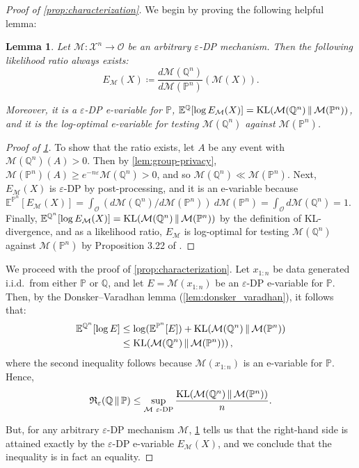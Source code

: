 \documentclass{article}
\DeclareMathOperator{\KLop}{KL}
\newcommand{\KL}[2]{%
  \mathchoice
    {\KLop\!\left(#1\,\middle\|\,#2\right)}%
    {\KLop(#1\,\Vert\,#2)}%
    {\KLop(#1\,\Vert\,#2)}%
    {\KLop(#1\,\Vert\,#2)}%
}
\newcommand{\Rdiv}[3][\eps]{%
  \mathfrak{R}_{#1}\!\left(#2\,\middle\|\,#3\right)%
}
\newcommand{\Null}{\mathbb{P}}
\newcommand{\E}{\mathbb{E}}
\newcommand{\Alt}{\mathbb{Q}}
\newcommand{\M}{\mathcal{M}}
\newcommand{\opt}{\Rdiv{\Alt}{\Null}}
\newcommand{\eps}{\varepsilon}
\newtheorem{lemma}{Lemma}[theorem]
\begin{document}
\begin{proof}[Proof of \cref{prop:characterization}]

We begin by proving the following helpful lemma:

\begin{lemma}\label{lem:dp-ratio}
    Let $\M: \mathcal{X}^n \to \mathcal{O}$ be an arbitrary $\varepsilon$-DP mechanism. Then the following likelihood ratio always exists:
    \begin{equation}
        E_\M(X)\coloneq\frac{d\M(\Alt^n)}{d\M(\Null^n)}(\M(X)).
    \end{equation}

    Moreover, it is a $\eps$-DP e-variable for $\Null$, $\E^\Alt[\log E_\M(X)] = \KL{\M(\Alt^n)}{\M(\Null^n)}$, and it is the log-optimal e-variable for testing $\M(\Alt^n)$ against $\M(\Null^n)$.
\end{lemma}
\begin{proof}[Proof of \cref{lem:dp-ratio}]
    To show that the ratio exists, let $A$ be any event with $\M(\Alt^n)(A) > 0$. Then by \cref{lem:group-privacy}, $\M(\Null^n)(A) \geq e^{-n\varepsilon}\M(\Alt^n) > 0$, and so $\M(\Alt^n) \ll \M(\Null^n)$.  Next, $E_\M(X)$ is $\eps$-DP by post-processing, and it is an e-variable because $\E^{\Null^n}[E_\M(X)] = \int_\mathcal{O} (d\M(\Alt^n)/d\M(\Null^n))~d\M(\Null^n) = \int_\mathcal{O} d\M(\Alt^n) = 1$. Finally, $\E^{\Alt^n}[\log E_\M(X)] = \KL{\M(\Alt^n)}{\M(\Null^n)}$ by the definition of KL-divergence, and as a likelihood ratio, $E_\M$ is log-optimal for testing $\M(\Alt^n)$ against $\M(\Null^n)$ by Proposition 3.22 of \citet{ramdasHypothesisTestingEvalues}.
\end{proof}


We proceed with the proof of \cref{prop:characterization}. Let $x_{1:n}$ be data generated i.i.d.\ from either $\Null$ or $\Alt$, and let $E=\M(x_{1:n})$ be an $\eps$-DP e-variable for $\Null$. Then, by the Donsker--Varadhan lemma (\cref{lem:donsker_varadhan}), it follows that:
\begin{align*}
    \E^{\Alt^n}[\log E] &\leq \log(\E^{\Null^n}[E]) +  \KL{\M(\Alt^n)}{\M(\Null^n)}\\
    &\leq \KL{\M(\Alt^n)}{\M(\Null^n))},
\end{align*}
where the second inequality follows because $\M(x_{1:n})$ is an e-variable for $\Null$. Hence,
\[\opt \leq \sup_{\M~\eps\text{-DP}} \frac{\KL{\M(\Alt^n)}{\M(\Null^n)}}{n}.\]

But, for any arbitrary $\eps$-DP mechanism $\M$, \cref{lem:dp-ratio} tells us that the right-hand side is attained exactly by the $\eps$-DP e-variable $E_\M(X)$, and we conclude that the inequality is in fact an equality. 
\end{proof}
\end{document}

